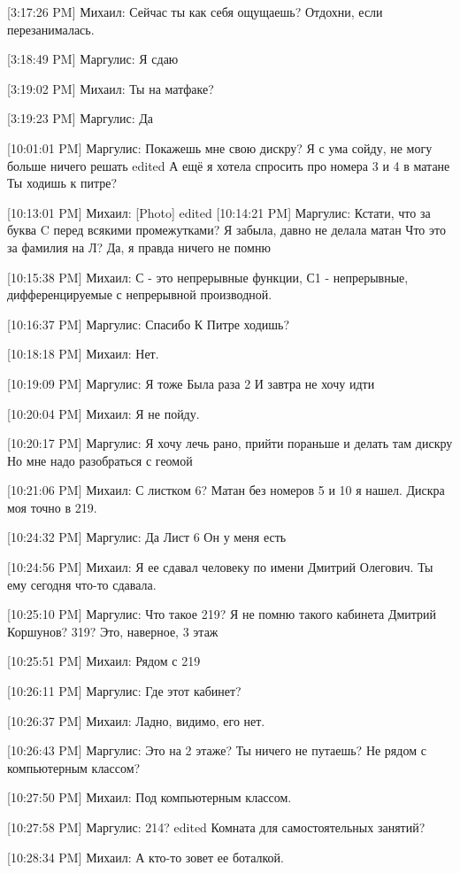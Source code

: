 \documentclass{article}
\begin{document}
[3:17:26 PM] Михаил:
Сейчас ты как себя ощущаешь? Отдохни, если перезанималась.

[3:18:49 PM] Маргулис:
Я сдаю

[3:19:02 PM] Михаил:
Ты на матфаке?

[3:19:23 PM] Маргулис:
Да

[10:01:01 PM] Маргулис:
Покажешь мне свою дискру? Я с ума сойду, не могу больше ничего решать
edited 
А ещё я хотела спросить про номера 3 и 4 в матане
 Ты ходишь к питре?

[10:13:01 PM] Михаил:
[Photo]
edited 
[10:14:21 PM] Маргулис:
Кстати, что за буква C перед всякими промежутками? Я забыла, давно не делала матан
 Что это за фамилия на Л? Да, я правда ничего не помню

[10:15:38 PM] Михаил:
С - это непрерывные функции, С1 - непрерывные, дифференцируемые с непрерывной производной.

[10:16:37 PM] Маргулис:
Спасибо
 К Питре ходишь?

[10:18:18 PM] Михаил:
Нет.

[10:19:09 PM] Маргулис:
Я тоже
 Была раза 2
 И завтра не хочу идти

[10:20:04 PM] Михаил:
Я не пойду.

[10:20:17 PM] Маргулис:
Я хочу лечь рано, прийти пораньше и делать там дискру
 Но мне надо разобраться с геомой

[10:21:06 PM] Михаил:
С листком 6?
 Матан без номеров 5 и 10 я нашел.
 Дискра моя точно в 219.

[10:24:32 PM] Маргулис:
Да
 Лист 6
 Он у меня есть

[10:24:56 PM] Михаил:
Я ее сдавал человеку по имени Дмитрий Олегович. Ты ему сегодня что-то сдавала.

[10:25:10 PM] Маргулис:
Что такое 219? Я не помню такого кабинета
 Дмитрий Коршунов? 319?
 Это, наверное, 3 этаж

[10:25:51 PM] Михаил:
Рядом с 219

[10:26:11 PM] Маргулис:
Где этот кабинет?

[10:26:37 PM] Михаил:
Ладно, видимо, его нет.

[10:26:43 PM] Маргулис:
Это на 2 этаже? Ты ничего не путаешь?
 Не рядом с компьютерным классом?

[10:27:50 PM] Михаил:
Под компьютерным классом.

[10:27:58 PM] Маргулис:
214?
edited 
Комната для самостоятельных занятий?

[10:28:34 PM] Михаил:
А кто-то зовет ее боталкой.
\end{document}
